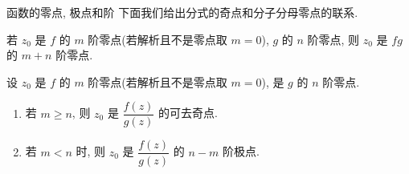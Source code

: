 






\begin{frame}{函数的零点, 极点和阶}
	\onslide<+->
	下面我们给出分式的奇点和分子分母零点的联系.
	\onslide<+->
	\begin{proposition}
		若 $z_0$ 是 $f$ 的 $m$ 阶零点(若解析且不是零点取 $m=0$), $g$ 的 $n$ 阶零点, 则 $z_0$ 是 $fg$ 的 $m+n$ 阶零点.
	\end{proposition}
	\onslide<+->
	\begin{proposition}
		设 $z_0$ 是 $f$ 的 $m$ 阶零点(若解析且不是零点取 $m=0$), 是 $g$ 的 $n$ 阶零点.
		\begin{enumerate}
			\item 若 $m\ge n$, 则 $z_0$ 是 $\dfrac{f(z)}{g(z)}$ 的可去奇点.
			\item 若 $m<n$ 时, 则 $z_0$ 是 $\dfrac{f(z)}{g(z)}$ 的 $n-m$ 阶极点.
		\end{enumerate}
	\end{proposition}
\end{frame}


